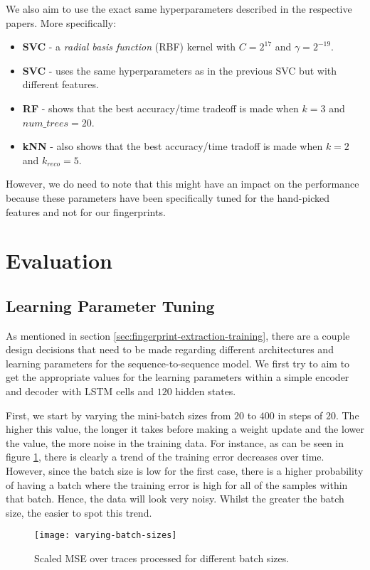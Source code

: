 We also aim to use the exact same hyperparameters described in the respective papers. More specifically:
\begin{itemize}
  \item \textbf{SVC} \cite{panchenko1} - a \textit{radial basis function} (RBF) kernel with $C = 2^{17}$ and $\gamma = 2^{-19}$.
  \item \textbf{SVC} \cite{panchenko2} - uses the same hyperparameters as in the previous SVC but with different features.
  \item \textbf{RF} \cite{kfingerprinting} - shows that the best accuracy/time tradeoff is made when $k = 3$ and $\textit{num\_trees} = 20$.
  \item \textbf{kNN} \cite{wang_cai_johnson_nithyanand_goldberg_2014} - also shows that the best accuracy/time tradoff is made when $k = 2$ and $k_{\textit{reco}} = 5$.
\end{itemize}

However, we do need to note that this might have an impact on the performance because these parameters have been specifically tuned for the hand-picked features and not for our fingerprints.

\section{Evaluation}

\subsection{Learning Parameter Tuning}

As mentioned in section \ref{sec:fingerprint-extraction-training}, there are a couple design decisions that need to be made regarding different architectures and learning parameters for the sequence-to-sequence model.
We first try to aim to get the appropriate values for the learning parameters within a simple encoder and decoder with LSTM cells and $120$ hidden states.

First, we start by varying the mini-batch sizes from $20$ to $400$ in steps of $20$.
The higher this value, the longer it takes before making a weight update and the lower the value, the more noise in the training data.
For instance, as can be seen in figure \ref{fig:varying-batch-sizes}, there is clearly a trend of the training error decreases over time.
However, since the batch size is low for the first case, there is a higher probability of having a batch where the training error is high for all of the samples within that batch.
Hence, the data will look very noisy.
Whilst the greater the batch size, the easier to spot this trend.
\begin{figure}[ht]
  \centering
  \texttt{[image: varying-batch-sizes]}
  \caption{Scaled MSE over traces processed for different batch sizes.}
  \label{fig:varying-batch-sizes}
\end{figure}


